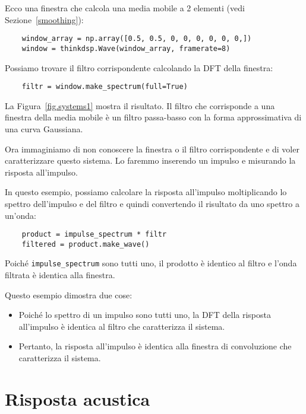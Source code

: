 \documentclass[12pt]{book} \usepackage[width=5.5in,height=8.5in, hmarginratio=3:2,vmarginratio=1:1]{geometry}
\begin{document}
Ecco una finestra che calcola una media mobile a 2 elementi (vedi Sezione~\ref{smoothing}):

\begin{verbatim} 
    window_array = np.array([0.5, 0.5, 0, 0, 0, 0, 0, 0,])
    window = thinkdsp.Wave(window_array, framerate=8)
 \end{verbatim} 

Possiamo trovare il filtro corrispondente calcolando la DFT della finestra:

\begin{verbatim} 
    filtr = window.make_spectrum(full=True)
 \end{verbatim} 

La Figura~\ref{fig.systems1} mostra il risultato. Il filtro che corrisponde a una finestra della media mobile è un filtro passa-basso con la forma approssimativa di una curva Gaussiana.

Ora immaginiamo di non conoscere la finestra o il filtro corrispondente e di voler caratterizzare questo sistema. Lo faremmo inserendo un impulso e misurando la risposta all'impulso.

In questo esempio, possiamo calcolare la risposta all'impulso moltiplicando lo spettro dell'impulso e del filtro e quindi convertendo il risultato da uno spettro a un'onda:

\begin{verbatim} 
    product = impulse_spectrum * filtr
    filtered = product.make_wave()
 \end{verbatim} 

Poiché \verb"impulse_spectrum" sono tutti uno, il prodotto è identico al filtro e l'onda filtrata è identica alla finestra.

Questo esempio dimostra due cose:

\begin{itemize} 

\item Poiché lo spettro di un impulso sono tutti uno, la DFT della risposta all'impulso è identica al filtro che caratterizza il sistema.

\item Pertanto, la risposta all'impulso è identica alla finestra di convoluzione che caratterizza il sistema.

\end{itemize} 

\section{Risposta acustica} \label{response} 
\end{document}
